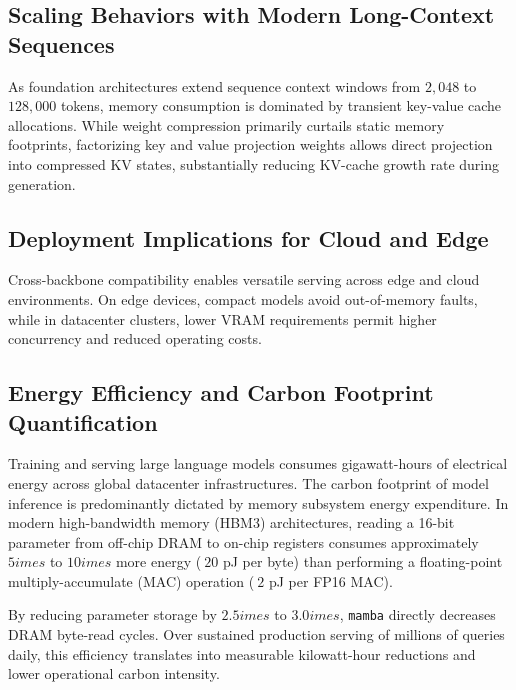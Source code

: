 \subsection{Scaling Behaviors with Modern Long-Context Sequences}
As foundation architectures extend sequence context windows from $2{,}048$ to $128{,}000$ tokens, memory consumption is dominated by transient key-value cache allocations. While weight compression primarily curtails static memory footprints, factorizing key and value projection weights allows direct projection into compressed KV states, substantially reducing KV-cache growth rate during generation.

\subsection{Deployment Implications for Cloud and Edge}
Cross-backbone compatibility enables versatile serving across edge and cloud environments. On edge devices, compact models avoid out-of-memory faults, while in datacenter clusters, lower VRAM requirements permit higher concurrency and reduced operating costs.

\subsection{Energy Efficiency and Carbon Footprint Quantification}
Training and serving large language models consumes gigawatt-hours of electrical energy across global datacenter infrastructures. The carbon footprint of model inference is predominantly dictated by memory subsystem energy expenditure. In modern high-bandwidth memory (HBM3) architectures, reading a 16-bit parameter from off-chip DRAM to on-chip registers consumes approximately $5	imes$ to $10	imes$ more energy ($~20$ pJ per byte) than performing a floating-point multiply-accumulate (MAC) operation ($~2$ pJ per FP16 MAC).

By reducing parameter storage by $2.5	imes$ to $3.0	imes$, \texttt{mamba} directly decreases DRAM byte-read cycles. Over sustained production serving of millions of queries daily, this efficiency translates into measurable kilowatt-hour reductions and lower operational carbon intensity.
